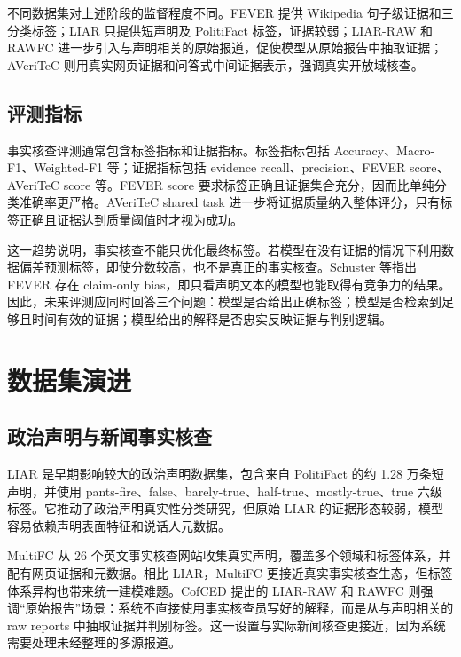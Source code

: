 \documentclass[UTF8,a4paper,zihao=5,twocolumn]{ctexart}
\begin{document}
不同数据集对上述阶段的监督程度不同。FEVER 提供 Wikipedia 句子级证据和三分类标签\cite{Thorne2018FEVER}；LIAR 只提供短声明及 PolitiFact 标签，证据较弱\cite{Wang2017LIAR}；LIAR-RAW 和 RAWFC 进一步引入与声明相关的原始报道，促使模型从原始报告中抽取证据\cite{Yang2022CofCED}；AVeriTeC 则用真实网页证据和问答式中间证据表示，强调真实开放域核查\cite{Schlichtkrull2023AVeriTeC}。

\subsection{评测指标}

事实核查评测通常包含标签指标和证据指标。标签指标包括 Accuracy、Macro-F1、Weighted-F1 等；证据指标包括 evidence recall、precision、FEVER score、AVeriTeC score 等。FEVER score 要求标签正确且证据集合充分，因而比单纯分类准确率更严格。AVeriTeC shared task 进一步将证据质量纳入整体评分，只有标签正确且证据达到质量阈值时才视为成功\cite{Schlichtkrull2024AVeriTeCShared}。

这一趋势说明，事实核查不能只优化最终标签。若模型在没有证据的情况下利用数据偏差预测标签，即使分数较高，也不是真正的事实核查。Schuster 等指出 FEVER 存在 claim-only bias，即只看声明文本的模型也能取得有竞争力的结果\cite{Schuster2019Debiasing}。因此，未来评测应同时回答三个问题：模型是否给出正确标签；模型是否检索到足够且时间有效的证据；模型给出的解释是否忠实反映证据与判别逻辑。

\section{数据集演进}

\subsection{政治声明与新闻事实核查}

LIAR 是早期影响较大的政治声明数据集，包含来自 PolitiFact 的约 1.28 万条短声明，并使用 pants-fire、false、barely-true、half-true、mostly-true、true 六级标签\cite{Wang2017LIAR}。它推动了政治声明真实性分类研究，但原始 LIAR 的证据形态较弱，模型容易依赖声明表面特征和说话人元数据。

MultiFC 从 26 个英文事实核查网站收集真实声明，覆盖多个领域和标签体系，并配有网页证据和元数据\cite{Augenstein2019MultiFC}。相比 LIAR，MultiFC 更接近真实事实核查生态，但标签体系异构也带来统一建模难题。CofCED 提出的 LIAR-RAW 和 RAWFC 则强调“原始报告”场景：系统不直接使用事实核查员写好的解释，而是从与声明相关的 raw reports 中抽取证据并判别标签\cite{Yang2022CofCED}。这一设置与实际新闻核查更接近，因为系统需要处理未经整理的多源报道。
\end{document}
